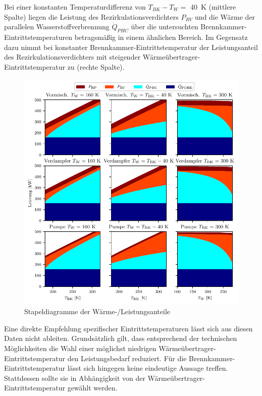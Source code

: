 Bei einer konstanten Temperaturdifferenz von $T_{BK}-T_W=$ \SI{40}{\K} (mittlere Spalte) liegen die Leistung des Rezirkulationsverdichters $P_{RV}$ und die Wärme der parallelen Wasserstoffverbrennung $\dot{Q}_{PHC}$ über die untersuchten Brennkammer-Eintrittstemperaturen betragsmäßig in einem ähnlichen Bereich. Im Gegensatz dazu nimmt bei konstanter Brennkammer-Eintrittstemperatur der Leistungsanteil des Rezirkulationsverdichters mit steigender Wärmeübertrager-Eintrittstemperatur zu (rechte Spalte).

\begin{figure}[ht]
\centering
\includegraphics[width=1\linewidth]{4_Abbildungen/2_Hauptteil/Ergebnisse/stackplot_summary.pdf}
  \caption{Stapeldiagramme der Wärme-/Leistungsanteile}
  \label{fig:stackplot}
\end{figure}
\FloatBarrier

Eine direkte Empfehlung spezifischer Eintrittstemperaturen lässt sich aus diesen Daten nicht ableiten. Grundsätzlich gilt, dass entsprechend der technischen Möglichkeiten die Wahl einer möglichst niedrigen Wärmeübertrager-Eintrittstemperatur den Leistungsbedarf reduziert. Für die Brennkammer-Eintrittstemperatur lässt sich hingegen keine eindeutige Aussage treffen. Stattdessen sollte sie in Abhängigkeit von der Wärmeübertrager-Eintrittstemperatur gewählt werden.

